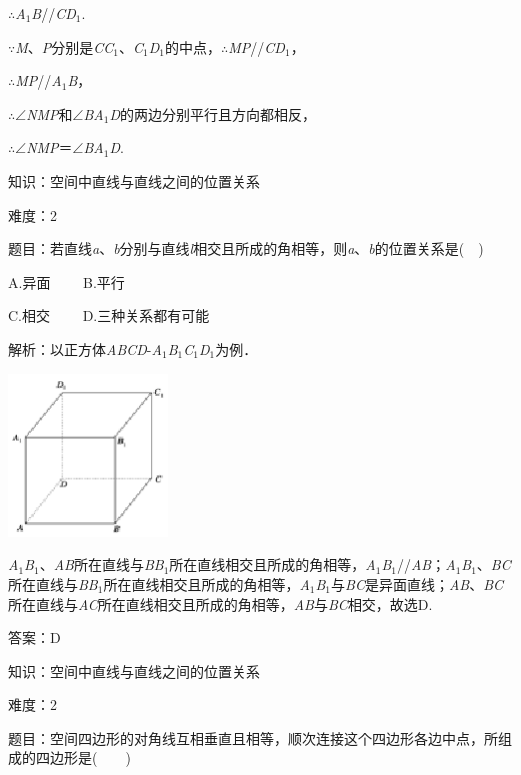 \documentclass{article} %
\begin{document}
$\mathrm{\therefore}$\textit{A}${}_{1}$\textit{B}//\textit{CD}${}_{1}$.

$\mathrm{\because}$\textit{M}、\textit{P}分别是\textit{CC}${}_{1}$、\textit{C}${}_{1}$\textit{D}${}_{1}$的中点，$\mathrm{\therefore}$\textit{MP}//\textit{CD}${}_{1}$，

$\mathrm{\therefore}$\textit{MP}//\textit{A}${}_{1}$\textit{B}，

$\mathrm{\therefore}$$\mathrm{\angle}$\textit{NMP}和$\mathrm{\angle}$\textit{BA}${}_{1}$\textit{D}的两边分别平行且方向都相反，

$\mathrm{\therefore}$$\mathrm{\angle}$\textit{NMP}＝$\mathrm{\angle}$\textit{BA}${}_{1}$\textit{D}.

知识：空间中直线与直线之间的位置关系

难度：2

题目：若直线\textit{a}、\textit{b}分别与直线\textit{l}相交且所成的角相等，则\textit{a}、\textit{b}的位置关系是(　)

A.异面　　  B.平行

C.相交　　  D.三种关系都有可能

解析：以正方体\textit{ABCD}-\textit{A}${}_{1}$\textit{B}${}_{1}$\textit{C}${}_{1}$\textit{D}${}_{1}$为例．

\includegraphics*[width=1.67in, height=1.70in, keepaspectratio=false]{image108}

\textit{A}${}_{1}$\textit{B}${}_{1}$、\textit{AB}所在直线与\textit{BB}${}_{1}$所在直线相交且所成的角相等，\textit{A}${}_{1}$\textit{B}${}_{1}$//\textit{AB}；\textit{A}${}_{1}$\textit{B}${}_{1}$、\textit{BC}所在直线与\textit{BB}${}_{1}$所在直线相交且所成的角相等，\textit{A}${}_{1}$\textit{B}${}_{1}$与\textit{BC}是异面直线；\textit{AB}、\textit{BC}所在直线与\textit{AC}所在直线相交且所成的角相等，\textit{AB}与\textit{BC}相交，故选D.

答案：D

知识：空间中直线与直线之间的位置关系

难度：2

题目：空间四边形的对角线互相垂直且相等，顺次连接这个四边形各边中点，所组成的四边形是(　　)
\end{document}
